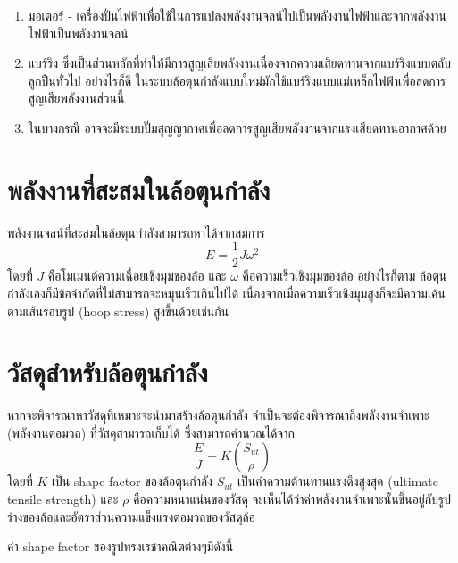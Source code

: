 \documentclass[a4paper,nobib,openany]{tufte-book}
\begin{document}
\begin{enumerate}
\item มอเตอร์ -
เครื่องปั่นไฟฟ้าเพื่อใช้ในการแปลงพลังงานจลน์ไปเป็นพลังงานไฟฟ้าและจากพลังงานไฟฟ้าเป็นพลังงานจลน์

\item แบร์ริง
ซึ่งเป็นส่วนหลักที่ทำให้มีการสูญเสียพลังงานเนื่องจากความเสียดทานจากแบร์ริงแบบตลับลูกปืนทั่วไป
อย่างไรก็ดี
ในระบบล้อตุนกำลังแบบใหม่มักใช้แบร์ริงแบบแม่เหล็กไฟฟ้าเพื่อลดการสูญเสียพลังงานส่วนนี้

\item ในบางกรณี
อาจจะมีระบบปั๊มสุญญากาศเพื่อลดการสูญเสียพลังงานจากแรงเสียดทานอากาศด้วย
\end{enumerate}

\section{พลังงานที่สะสมในล้อตุนกำลัง}
\label{sec:org9e7ce56}
พลังงานจลน์ที่สะสมในล้อตุนกำลังสามารถหาได้จากสมการ
\[E = \frac{1}{2}J \omega^2\] โดยที่ \(J\)
คือโมเมนต์ความเฉื่อยเชิงมุมของล้อ และ \(\omega\)
คือความเร็วเชิงมุมของล้อ อย่างไรก็ตาม
ล้อตุนกำลังเองก็มีข้อจำกัดที่ไม่สามารถจะหมุนเร็วเกินไปได้
เนื่องจากเมื่อความเร็วเชิงมุมสูงก็จะมีความเค้นตามเส้นรอบรูป (hoop
stress) สูงขึ้นด้วยเช่นกัน

\section{วัสดุสำหรับล้อตุนกำลัง}
\label{sec:orgc173cc9}
หากจะพิจารณาหาวัสดุที่เหมาะจะนำมาสร้างล้อตุนกำลัง
จำเป็นจะต้องพิจารณาถึงพลังงานจำเพาะ (พลังงานต่อมวล)
ที่วัสดุสามารถเก็บได้ ซึ่งสามารถคำนวณได้จาก
\[\frac{E}{J} = K \left( \frac{S_{ut}}{\rho} \right)\] โดยที่ \(K\) เป็น
shape factor ของล้อตุนกำลัง \(S_{ut}\) เป็นค่าความต้านทานแรงดึงสูงสุด
(ultimate tensile strength) และ \(\rho\) คือความหนาแน่นของวัสดุ
จะเห็นได้ว่าค่าพลังงานจำเพาะนั้นขึ้นอยู่กับรูปร่างของล้อและอัตราส่วนความแข็งแรงต่อมวลของวัสดุล้อ

ค่า shape factor ของรูปทรงเรชาคณิตต่างๆมีดังนี้
\end{document}

